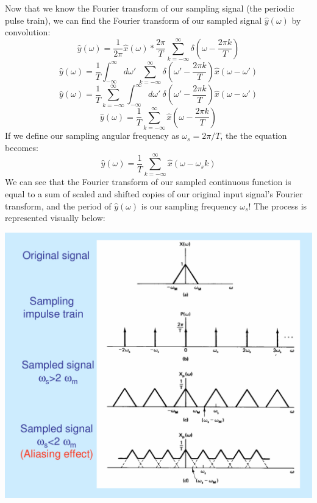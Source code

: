 \documentclass[a4paper]{article}
\numberwithin{equation}{section}
\begin{document}
Now that we know the Fourier transform of our sampling signal (the periodic pulse train), we can find the Fourier transform of our sampled signal $\hat{y}(\omega)$ by convolution:
\begin{equation}
\hat{y}(\omega) = \frac{1}{2\pi}\hat{x}(\omega) * \frac{2\pi}{T}\sum_{k=-\infty}^{\infty}\delta(\omega-\frac{2\pi k}{T})
\end{equation}
\begin{equation}
\hat{y}(\omega) = \frac{1}{T}\int_{-\infty}^{\infty}d\omega' \: \sum_{k=-\infty}^{\infty}\delta(\omega'-\frac{2\pi k}{T})\hat{x}(\omega-\omega')
\end{equation}
\begin{equation}
\hat{y}(\omega) = \frac{1}{T}\sum_{k=-\infty}^{\infty}\int_{-\infty}^{\infty}d\omega' \: \delta(\omega'-\frac{2\pi k}{T})\hat{x}(\omega-\omega')
\end{equation}
\begin{equation}
\hat{y}(\omega) = \frac{1}{T}\sum_{k=-\infty}^{\infty}\hat{x}(\omega-\frac{2\pi k}{T})
\end{equation}
If we define our sampling angular frequency as $\omega_s = 2\pi / T $, the the equation becomes:
\begin{equation}
\hat{y}(\omega) = \frac{1}{T}\sum_{k=-\infty}^{\infty}\hat{x}(\omega-\omega_s k)
\end{equation}
We can see that the Fourier transform of our sampled continuous function is equal to a sum of scaled and shifted copies of our original input signal's Fourier transform, and the period of $\hat{y}(\omega)$ is our sampling frequency $\omega_s$! The process is represented visually below:
\begin{center}
\includegraphics[scale=0.5]{aliasing.png}
\end{center}
\end{document}
